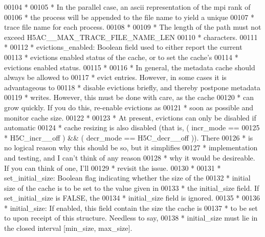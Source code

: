 \begin{DoxyCode}
00104 \textcolor{comment}{ *}
00105 \textcolor{comment}{ *  In the parallel case, an ascii representation of the mpi rank of}
00106 \textcolor{comment}{ *  the process will be appended to the file name to yield a unique}
00107 \textcolor{comment}{ *  trace file name for each process.}
00108 \textcolor{comment}{ *}
00109 \textcolor{comment}{ *  The length of the path must not exceed H5AC\_\_MAX\_TRACE\_FILE\_NAME\_LEN}
00110 \textcolor{comment}{ *  characters.}
00111 \textcolor{comment}{ *}
00112 \textcolor{comment}{ * evictions\_enabled:  Boolean field used to either report the current}
00113 \textcolor{comment}{ *  evictions enabled status of the cache, or to set the cache's}
00114 \textcolor{comment}{ *  evictions enabled status.}
00115 \textcolor{comment}{ *}
00116 \textcolor{comment}{ *  In general, the metadata cache should always be allowed to}
00117 \textcolor{comment}{ *  evict entries.  However, in some cases it is advantageous to}
00118 \textcolor{comment}{ *  disable evictions briefly, and thereby postpone metadata}
00119 \textcolor{comment}{ *  writes.  However, this must be done with care, as the cache}
00120 \textcolor{comment}{ *  can grow quickly.  If you do this, re-enable evictions as}
00121 \textcolor{comment}{ *  soon as possible and monitor cache size.}
00122 \textcolor{comment}{ *}
00123 \textcolor{comment}{ *  At present, evictions can only be disabled if automatic}
00124 \textcolor{comment}{ *  cache resizing is also disabled (that is, ( incr\_mode ==}
00125 \textcolor{comment}{ *  H5C\_incr\_\_off ) && ( decr\_mode == H5C\_decr\_\_off )).  There}
00126 \textcolor{comment}{ *  is no logical reason why this should be so, but it simplifies}
00127 \textcolor{comment}{ *  implementation and testing, and I can't think of any reason}
00128 \textcolor{comment}{ *  why it would be desireable.  If you can think of one, I'll}
00129 \textcolor{comment}{ *  revisit the issue.}
00130 \textcolor{comment}{ *}
00131 \textcolor{comment}{ * set\_initial\_size: Boolean flag indicating whether the size of the}
00132 \textcolor{comment}{ *      initial size of the cache is to be set to the value given in}
00133 \textcolor{comment}{ *      the initial\_size field.  If set\_initial\_size is FALSE, the}
00134 \textcolor{comment}{ *      initial\_size field is ignored.}
00135 \textcolor{comment}{ *}
00136 \textcolor{comment}{ * initial\_size: If enabled, this field contain the size the cache is}
00137 \textcolor{comment}{ *      to be set to upon receipt of this structure.  Needless to say,}
00138 \textcolor{comment}{ *      initial\_size must lie in the closed interval [min\_size, max\_size].}

\end{DoxyCode}
